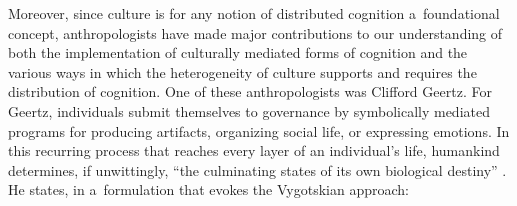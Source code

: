 Moreover, since culture is for any notion of distributed cognition a~foundational concept, anthropologists have made major contributions to our understanding of both the implementation of culturally mediated forms of cognition and the various ways in which the heterogeneity of culture supports and requires the distribution of cognition. One of these anthropologists was Clifford Geertz. For Geertz, individuals submit themselves to governance by symbolically mediated programs for producing artifacts, organizing social life, or expressing emotions. In this recurring process that reaches every layer of an individual's life, humankind determines, if unwittingly, ``the culminating states of its own biological destiny''
\parencite[][p.48]{geertz_interpretation_1973}. %
 He states, in a~formulation that evokes the Vygotskian approach:

